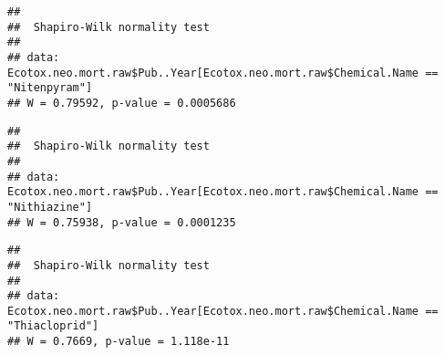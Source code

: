 \documentclass[]{article}
\newenvironment{Shaded}{\begin{snugshade}}{\end{snugshade}}
\newcommand{\KeywordTok}[1]{\textcolor[rgb]{0.13,0.29,0.53}{\textbf{#1}}}
\newcommand{\StringTok}[1]{\textcolor[rgb]{0.31,0.60,0.02}{#1}}
\newcommand{\OperatorTok}[1]{\textcolor[rgb]{0.81,0.36,0.00}{\textbf{#1}}}
\newcommand{\NormalTok}[1]{#1}
\begin{document}
\begin{Shaded}
\end{Shaded}

\begin{verbatim}
## 
##  Shapiro-Wilk normality test
## 
## data:  Ecotox.neo.mort.raw$Pub..Year[Ecotox.neo.mort.raw$Chemical.Name ==     "Nitenpyram"]
## W = 0.79592, p-value = 0.0005686
\end{verbatim}

\begin{Shaded}
\end{Shaded}

\begin{verbatim}
## 
##  Shapiro-Wilk normality test
## 
## data:  Ecotox.neo.mort.raw$Pub..Year[Ecotox.neo.mort.raw$Chemical.Name ==     "Nithiazine"]
## W = 0.75938, p-value = 0.0001235
\end{verbatim}

\begin{Shaded}
\end{Shaded}

\begin{verbatim}
## 
##  Shapiro-Wilk normality test
## 
## data:  Ecotox.neo.mort.raw$Pub..Year[Ecotox.neo.mort.raw$Chemical.Name ==     "Thiacloprid"]
## W = 0.7669, p-value = 1.118e-11
\end{verbatim}

\begin{Shaded}
\end{Shaded}
\end{document}
